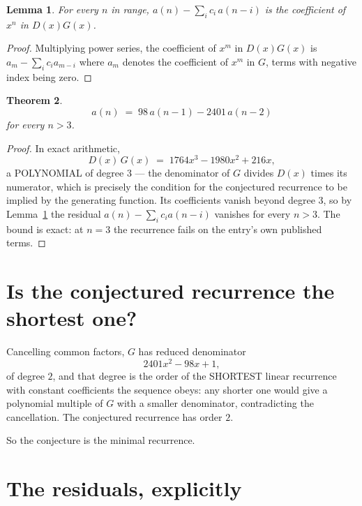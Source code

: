 \documentclass[11pt,a4paper]{article}
\theoremstyle{plain}
\newtheorem{theorem}{Theorem}
\newtheorem{lemma}[theorem]{Lemma}
\theoremstyle{definition}
\begin{document}
\begin{lemma}\label{lem:key}
For every $n$ in range, $a(n)-\sum_i c_i\,a(n-i)$ is the coefficient of $x^{n}$ in
$D(x)G(x)$.
\end{lemma}

\begin{proof}
Multiplying power series, the coefficient of $x^{m}$ in $D(x)G(x)$ is
$a_m-\sum_i c_i a_{m-i}$ where $a_m$ denotes the coefficient of $x^{m}$ in $G$, terms with
negative index being zero.
\end{proof}

\begin{theorem}
\[
a(n)\;=\;98\,a(n-1) - 2401\,a(n-2)
\]
for every $n>3$.
\end{theorem}

\begin{proof}
In exact arithmetic,
\[
D(x)\,G(x)\;=\;1764 x^{3} - 1980 x^{2} + 216 x,
\]
a POLYNOMIAL of degree $3$ --- the denominator of $G$ divides $D(x)$ times its numerator,
which is precisely the condition for the conjectured recurrence to be implied by the
generating function. Its coefficients vanish beyond degree $3$, so by
Lemma~\ref{lem:key} the residual $a(n)-\sum_ic_ia(n-i)$ vanishes for every
$n>3$. The bound is exact: at $n=3$ the recurrence fails on the entry's own published terms.
\end{proof}

\section{Is the conjectured recurrence the shortest one?}

Cancelling common factors, $G$ has reduced denominator
\[
2401 x^{2} - 98 x + 1,
\]
of degree $2$, and that degree is the order of the SHORTEST linear recurrence with
constant coefficients the sequence obeys: any shorter one would give a polynomial multiple of
$G$ with a smaller denominator, contradicting the cancellation. The conjectured recurrence has
order $2$.

So the conjecture is the minimal recurrence.

\section{The residuals, explicitly}
\end{document}
